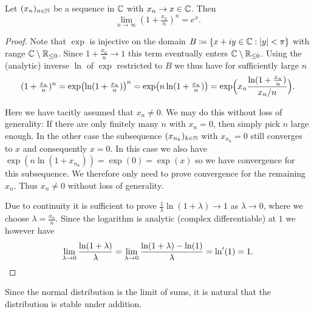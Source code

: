 \begin{lemma}
    \label{lem: compound interest} Let \((x_n)_{n\in \mathbb{N}}\) be a sequence in \(\mathbb{C}\)
    with \(x_n \to x\in \mathbb{C}\). Then
    \[
        \lim_{n\to\infty} (1+\tfrac{x_n}n)^n = e^{x}.
    \]
\end{lemma}
\begin{proof}
    Note that \(\exp\) is injective on the domain \(B\coloneq\{x+iy\in \mathbb{C}: \lvert y\rvert < \pi\}\)
    with range \(\mathbb{C}\setminus \mathbb{R}_{\le 0}\). Since \(1+\frac{x_n}n \to
    1\) this term eventually enters \(\mathbb{C}\setminus \mathbb{R}_{\le
    0}\). Using the (analytic) inverse \(\ln\) of \(\exp\) restricted to \(B\)
    we thus have for sufficiently large \(n\)
    \[
        (1 + \tfrac{x_n}n)^n
        = \exp\bigl(\ln(1 + \tfrac{x_n}n)\bigr)^n
        = \exp\bigl(n \ln(1 + \tfrac{x_n}n)\bigr)
        = \exp\Bigl(x_n \frac{\ln(1 + \tfrac{x_n}n)}{x_n/n}\Bigr).
    \]
    \vspace*{-2ex}
    \begin{mdframed}[innertopmargin=0pt,innerbottommargin=0pt,rightline=false,topline=false,bottomline=false]
    Here we have tacitly assumed that \(x_n \neq 0\). We may
    do this without loss of generality:
    If there are only finitely many \(n\) with \(x_n=0\), then
    simply pick \(n\) large enough. In the other case
    the subsequence \((x_{n_k})_{k\in \mathbb{N}}\) with \(x_{n_k} = 0\) still
    converges to \(x\) and consequently \(x=0\). In this case
    we also have \(\exp(n \ln(1+x_{n_k})) = \exp(0)= \exp(x)\) so
    we have convergence for this subsequence. We therefore only need
    to prove convergence for the remaining \(x_n\).
    Thus \(x_n\neq 0\) without loss of generality.
    \end{mdframed}
    Due to continuity it is sufficient to prove \(\frac1\lambda\ln(1 +
    \lambda) \to 1\) as \(\lambda \to 0\), where we choose \(\lambda = \frac{x_n}n\). Since the logarithm is analytic
    (complex differentiable)
    at \(1\) we however have
    \[
        \lim_{\lambda \to 0} \frac{\ln(1 + \lambda)}{\lambda}
        = \lim_{\lambda \to 0} \frac{\ln(1 + \lambda) - \ln(1)}{\lambda}
        = \ln'(1)
        = 1. \qedhere
    \]
\end{proof}

Since the normal distribution is the limit of sums, it is natural that the
distribution is stable under addition.

